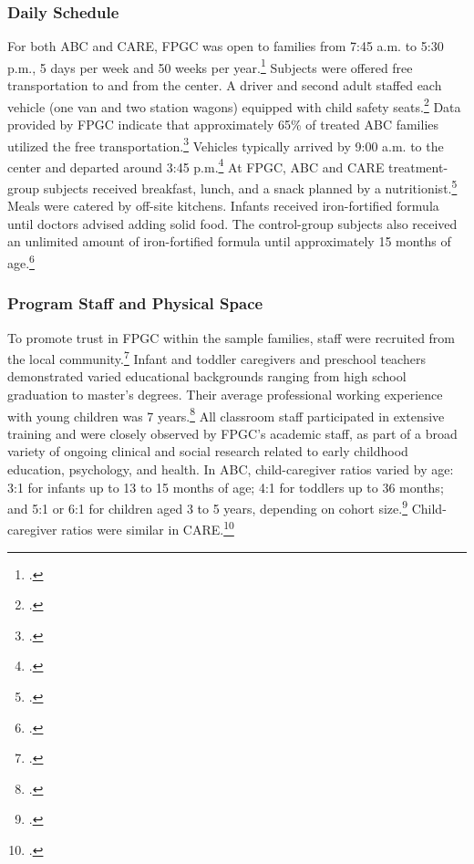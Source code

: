 \begin{appendices}
\subsubsection{Daily Schedule}
\noindent For both ABC and CARE, FPGC was open to families from 7:45 a.m. to 5:30 p.m., 5 days per week and 50 weeks per year.\footnote{\citet{Ramey_Collier_etal_1976_CarolinaAbecedarianProject, Ramey_etal_1985_Project-CARE_TiECSE}.} Subjects were offered free transportation to and from the center. A driver and second adult staffed each vehicle (one van and two station wagons) equipped with child safety seats.\footnote{\citet{Ramey_Campbell_1979_SR,abc2014-2015interviews}.} Data provided by FPGC indicate that approximately 65\% of treated ABC families utilized the free transportation.\footnote{\citet{Barnett_Masse_2002_benefitcost}.} Vehicles typically arrived by 9:00 a.m. to the center and departed around 3:45 p.m.\footnote{\citet{Ramey-et-al_1977_Intro-to-ABC}.} At FPGC, ABC and CARE treatment-group subjects received breakfast, lunch, and a snack planned by a nutritionist.\footnote{ \citet{Haskins_1985_CD, Bryant_et_al_1987_Carolina_Approach_TIECSE, Ramey-et-al_1977_Intro-to-ABC}.} Meals were catered by off-site kitchens. Infants received iron-fortified formula  until doctors advised adding solid food. The control-group subjects also received an unlimited amount of iron-fortified formula until approximately 15 months of age.\footnote{\citet{Campbell_Conti_etal_2014_EarlyChildhoodInvestments,abc2014-2015interviews}.}\\

\subsubsection{Program Staff and Physical Space}
\noindent To promote trust in FPGC within the sample families, staff were recruited from the local community.\footnote{\citet{Ramey-et-al_1977_Intro-to-ABC, Bryant_et_al_1987_Carolina_Approach_TIECSE, Feagans_1996_Childrens-Talk,abc2014-2015interviews}.} Infant and toddler caregivers and preschool teachers demonstrated varied educational backgrounds ranging from high school graduation to master's degrees. Their average professional working experience with young children was 7 years.\footnote{\citet{Ramey_McGinness_etal_1982_Abecedarianapproach, Ramey_etal_1985_Project-CARE_TiECSE, Wasik_Ramey_etal_1990_CD}.} All classroom staff participated in extensive training and were closely observed by FPGC's academic staff, as part of a broad variety of ongoing clinical and social research related to early childhood education, psychology, and health. In ABC, child-caregiver ratios varied by age: 3:1 for infants up to 13 to 15 months of age; 4:1 for toddlers up to 36 months; and 5:1 or 6:1 for children aged 3 to 5 years, depending on cohort size.\footnote{\citet{Ramey-et-al_1977_Intro-to-ABC,Ramey_Campbell_1979_SR,Ramey_McGinness_etal_1982_Abecedarianapproach}.} Child-caregiver ratios were similar in CARE.\footnote{\citet{Burchinal_Campbell_etal_1997_CD, Ramey_etal_1985_Project-CARE_TiECSE}.}\\


\end{appendices}
